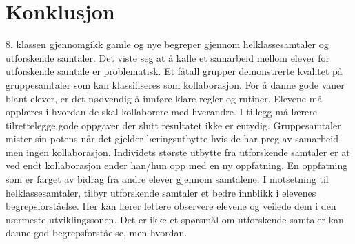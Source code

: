 \documentclass[main.tex]{subfiles}
\begin{document}
\section*{Konklusjon}
\label{sec:4}

8. klassen gjennomgikk gamle og nye begreper gjennom helklassesamtaler og utforskende 
samtaler. Det viste seg at å kalle et samarbeid mellom elever for utforskende samtale
er problematisk. Et fåtall grupper demonstrerte kvalitet på gruppesamtaler som kan
klassifiseres som kollaborasjon. For å danne gode vaner blant elever, er det nødvendig 
å innføre klare regler og rutiner. Elevene må opplæres i hvordan de skal kollaborere 
med hverandre. I tillegg må lærere tilrettelegge gode oppgaver der slutt resultatet 
ikke er entydig. Gruppesamtaler mister sin potens når det gjelder læringsutbytte hvis 
de har preg av samarbeid men ingen kollaborasjon. Individets største utbytte fra 
utforskende samtaler er at ved endt kollaborasjon ender han/hun opp med en ny oppfatning. 
En oppfatning som er farget av bidrag fra andre elever gjennom samtalene.
I motsetning til helklassesamtaler, tilbyr utforskende samtaler et bedre innblikk
i elevenes begrepsforståelse. Her kan lærer lettere observere elevene og veilede
dem i den nærmeste utviklingssonen.
\newline
\newline
Det er ikke et spørsmål om utforskende samtaler kan danne god begrepsforståelse, men 
hvordan.
\end{document}
